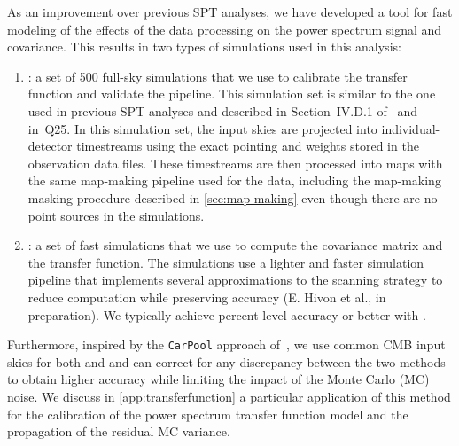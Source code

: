As an improvement over previous SPT analyses, we have developed a tool for fast modeling of the effects of the data processing on the power spectrum signal and covariance. This results in two types of simulations used in this analysis:
\begin{enumerate}
	\item \fullmock{}: a set of 500 full-sky simulations that we use to calibrate the transfer function and validate the pipeline. This simulation set is similar to the one used in previous SPT analyses and described in Section~IV.D.1 of~\citep{dutcher21} and in~Q25. In this simulation set, the input skies are projected into individual-detector timestreams using the exact pointing and weights stored in the observation data files. These timestreams are then processed into maps with the same map-making pipeline used for the data, including the map-making masking procedure described in \cref{sec:map-making} even though there are no point sources in the simulations.
	\item \quickmock{}: a set of  fast simulations that we use to compute the covariance matrix and the transfer function. The \quickmock{} simulations use a lighter and faster simulation pipeline that implements several approximations to the scanning strategy to reduce computation while preserving accuracy (E. Hivon et al., in preparation). We typically achieve percent-level accuracy or better with \quickmock{}. 
\end{enumerate}
Furthermore, inspired by the \texttt{CarPool} approach of~\citep{chartier_carpool_2021}, we use common CMB input skies for both \fullmock{} and \quickmock{} and can correct for any discrepancy between the two methods to obtain higher accuracy while limiting the impact of the Monte Carlo (MC) noise. We discuss in \cref{app:transferfunction} a particular application of this method for the calibration of the power spectrum transfer function model and the propagation of the residual MC variance.

